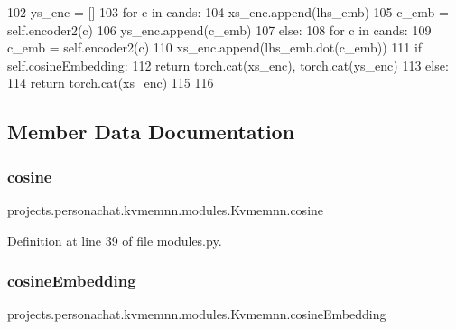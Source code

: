 \begin{DoxyCode}
102                 ys\_enc = []
103                 \textcolor{keywordflow}{for} c \textcolor{keywordflow}{in} cands:
104                     xs\_enc.append(lhs\_emb)
105                     c\_emb = self.encoder2(c)
106                     ys\_enc.append(c\_emb)
107             \textcolor{keywordflow}{else}:
108                 \textcolor{keywordflow}{for} c \textcolor{keywordflow}{in} cands:
109                     c\_emb = self.encoder2(c)
110                     xs\_enc.append(lhs\_emb.dot(c\_emb))
111         \textcolor{keywordflow}{if} self.cosineEmbedding:
112             \textcolor{keywordflow}{return} torch.cat(xs\_enc), torch.cat(ys\_enc)
113         \textcolor{keywordflow}{else}:
114             \textcolor{keywordflow}{return} torch.cat(xs\_enc)
115 
116 
\end{DoxyCode}


\subsection{Member Data Documentation}
\mbox{\label{classprojects_1_1personachat_1_1kvmemnn_1_1modules_1_1Kvmemnn_ad528a310e56005644b5c02b2cf026386}} 
\subsubsection{\texorpdfstring{cosine}{cosine}}
{\footnotesize\ttfamily projects.\+personachat.\+kvmemnn.\+modules.\+Kvmemnn.\+cosine}



Definition at line 39 of file modules.\+py.

\mbox{\label{classprojects_1_1personachat_1_1kvmemnn_1_1modules_1_1Kvmemnn_a34b907f62828207f3e0204afa56986d3}} 
\subsubsection{\texorpdfstring{cosine\+Embedding}{cosineEmbedding}}
{\footnotesize\ttfamily projects.\+personachat.\+kvmemnn.\+modules.\+Kvmemnn.\+cosine\+Embedding}



